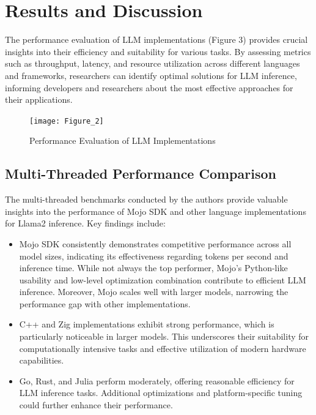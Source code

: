 \documentclass[sigconf]{acmart}
\begin{document}
\section{Results and Discussion}
The performance evaluation of LLM implementations (Figure 3) provides crucial insights into their efficiency and suitability for various tasks. By assessing metrics such as throughput, latency, and resource utilization across different languages and frameworks, researchers can identify optimal solutions for LLM inference, informing developers and researchers about the most effective approaches for their applications.
\begin{figure}[htbp]
  \centering
  \texttt{[image: Figure\_2]}
  \caption{Performance Evaluation of LLM Implementations}
\end{figure}

\subsection{Multi-Threaded Performance Comparison}
The multi-threaded benchmarks conducted by the authors provide valuable insights into the performance of Mojo SDK and other language implementations for Llama2 inference. Key findings include:
\begin{itemize}
  \item Mojo SDK consistently demonstrates competitive performance across all model sizes, indicating its effectiveness regarding tokens per second and inference time. While not always the top performer, Mojo's Python-like usability and low-level optimization combination contribute to efficient LLM inference. Moreover, Mojo scales well with larger models, narrowing the performance gap with other implementations.
  \item C++ and Zig implementations exhibit strong performance, which is particularly noticeable in larger models. This underscores their suitability for computationally intensive tasks and effective utilization of modern hardware capabilities.
  \item Go, Rust, and Julia perform moderately, offering reasonable efficiency for LLM inference tasks. Additional optimizations and platform-specific tuning could further enhance their performance.
\end{itemize}
\end{document}
